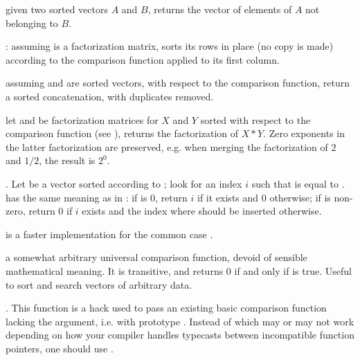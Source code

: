  given two sorted
vectors $A$ and $B$, returns the vector of elements of $A$ not belonging to
$B$.

:
assuming  is a factorization matrix, sorts its rows in place (no copy
is made) according to the comparison function  applied to its first
column.

assuming  and  are sorted vectors, with respect to the 
comparison function, return a sorted concatenation, with duplicates removed.

let  and  be factorization matrices for $X$ and $Y$
sorted with respect to the comparison function  (see
), returns the factorization of $X * Y$. Zero exponents in
the latter factorization are preserved, e.g. when merging the factorization
of $2$ and $1/2$, the result is $2^0$.

.\hfil\break
Let  be a vector sorted according to ; look for an
index $i$ such that   is equal to .  has the
same meaning as in : if  is 0, return $i$ if it
exists and 0 otherwise; if  is non-zero, return $0$ if $i$ exists
and the index where  should be inserted otherwise.

 is a faster
implementation for the common case .


 a somewhat arbitrary universal
comparison function, devoid of sensible mathematical meaning. It is
transitive, and returns 0 if and only if  is true.
Useful to sort and search vectors of arbitrary data.

. This function is a hack
used to pass an existing basic comparison function lacking the 
argument, i.e. with prototype . Instead of
 which may or may not work depending on how your
compiler handles typecasts between incompatible function pointers, one should
use .


